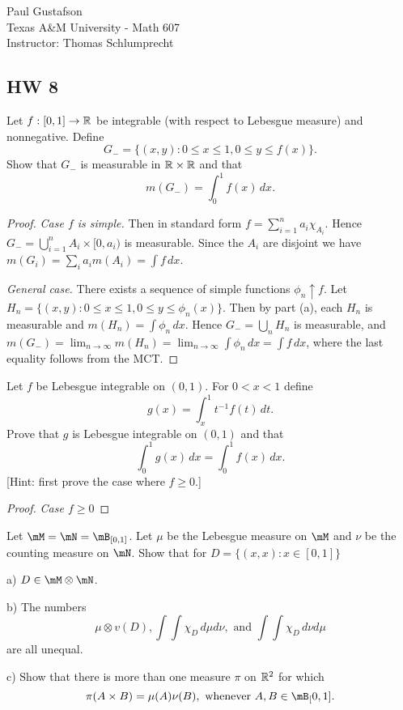 \documentclass{article}
\begin{document}
\noindent Paul Gustafson\\
\noindent Texas A\&M University - Math 607\\ 
\noindent Instructor: Thomas Schlumprecht

\subsection*{HW 8}
 Let $f:[0,1] \to \mathbb{R}$ be integrable (with respect to Lebesgue measure) and nonnegative. Define 
$$G_{-} =  \{(x,y) : 0 \le x \le 1, 0 \le y \le f(x) \}.$$
Show that $G_-$ is measurable in $\mathbb{R} \times \mathbb{R}$ and that 
$$m(G_-) = \int_0^1 f(x) \, dx.$$
\begin{proof}
\emph{Case $f$ is simple.}  Then in standard form $f = \sum_{i=1}^n a_i \chi_{A_i}$.  Hence $G_- = \bigcup_{i=1}^n A_i \times [0, a_i)$ is measurable. Since the $A_i$ are disjoint we have $m(G_i) = \sum_i a_i m(A_i) = \int f \, dx$.

\emph{General case.} There exists a sequence of simple functions $\phi_n \uparrow f$.   Let $H_n = \{(x,y) : 0 \le x \le 1, 0 \le y \le \phi_n(x) \}$.  Then by part (a), each $H_n$ is measurable and $m(H_n) = \int \phi_n \, dx$.  Hence $G_- = \bigcup_n H_n$ is measurable, and $m(G_-) = \lim_{n \to \infty} m(H_n) = \lim_{n \to \infty} \int \phi_n \, dx = \int f \, dx$, where the last equality follows from the MCT.
\end{proof}

 Let $f$ be Lebesgue integrable on $(0,1)$. For $0< x < 1$ define
$$g(x) = \int_x^1 t^{-1} f(t) \, dt.$$
Prove that $g$ is Lebesgue integrable on $(0,1)$ and that 
$$\int_0^1 g(x) \, dx = \int_0^1 f(x) \, dx.$$
[Hint: first prove the case where $f \ge 0$.]
\begin{proof}
\emph{Case $f \ge 0$} 

\end{proof}


 Let $\mM = \mN = \mB_{[0,1]}$. Let $\mu$ be the Lebesgue measure on $\mM$ and $\nu$ be the counting measure on $\mN$. Show that for $D = \{(x,x) : x \in [0,1]\}$

a) $D \in \mM \otimes \mN$.

b) The numbers 
$$\mu \otimes v (D), \int \int \chi_D \, d\mu d\nu, \text{ and } \int \int \chi_D \, d\nu d\mu$$
are all unequal.

c) Show that there is more than one measure $\pi$ on $\mathbb{R}^2$ for which
$$ \pi(A \times B) = \mu(A) \nu(B), \text{ whenever } A, B \in \mB_[0,1].$$
\end{document}
